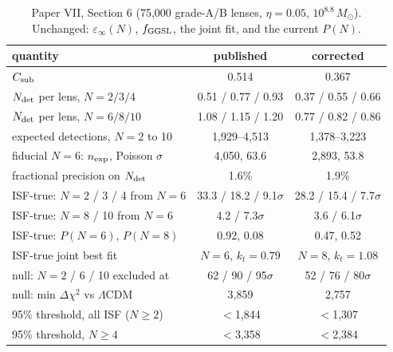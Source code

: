 \documentclass[twocolumn,11pt]{article}
\newcommand{\lcdm}{$\Lambda$CDM}
\newcommand{\Msun}{M_\odot}
\newcommand{\einf}{\varepsilon_\infty}
\newcommand{\Ndet}{N_{\rm det}}
\newcommand{\Csub}{C_{\rm sub}}
\begin{document}
\begin{table}
\centering
\caption{Paper VII, Section 6 (75,000 grade-A/B lenses, $\eta=0.05$,
$10^{8.8}\,\Msun$). Unchanged: $\einf(N)$, $f_{\rm GGSL}$, the joint
fit, and the current $P(N)$.}
\label{tab:p7}
\small
\setlength{\tabcolsep}{4pt}
\begin{tabular}{lcc}
\toprule
quantity & published & corrected \\
\midrule
$\Csub$                                       & 0.514 & 0.367 \\
$\Ndet$ per lens, $N=2/3/4$                   & 0.51 / 0.77 / 0.93 & 0.37 / 0.55 / 0.66 \\
$\Ndet$ per lens, $N=6/8/10$                  & 1.08 / 1.15 / 1.20 & 0.77 / 0.82 / 0.86 \\
expected detections, $N=2$ to 10              & 1,929--4,513 & 1,378--3,223 \\
fiducial $N=6$: $n_{\rm exp}$, Poisson $\sigma$ & 4,050, 63.6 & 2,893, 53.8 \\
fractional precision on $\Ndet$               & 1.6\% & 1.9\% \\
ISF-true: $N=2$ / 3 / 4 from $N=6$            & 33.3 / 18.2 / 9.1$\sigma$ & 28.2 / 15.4 / 7.7$\sigma$ \\
ISF-true: $N=8$ / 10 from $N=6$               & 4.2 / 7.3$\sigma$ & 3.6 / 6.1$\sigma$ \\
ISF-true: $P(N=6)$, $P(N=8)$                  & 0.92, 0.08 & 0.47, 0.52 \\
ISF-true joint best fit                       & $N=6$, $k_t=0.79$ & $N=8$, $k_t=1.08$ \\
null: $N=2$ / 6 / 10 excluded at              & 62 / 90 / 95$\sigma$ & 52 / 76 / 80$\sigma$ \\
null: min $\Delta\chi^2$ vs \lcdm             & 3,859 & 2,757 \\
95\% threshold, all ISF ($N\geq2$)            & $<$1,844 & $<$1,307 \\
95\% threshold, $N\geq4$                      & $<$3,358 & $<$2,384 \\
\bottomrule
\end{tabular}
\end{table}
\end{document}
